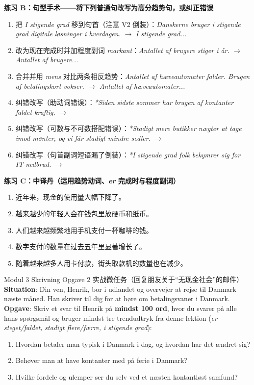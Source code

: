 \textbf{练习 B：句型手术——将下列普通句改写为高分趋势句，或纠正错误}
\begin{enumerate}
  \item 把 \textit{I stigende grad} 移到句首（注意 V2 倒装）：\textit{Danskerne bruger i stigende grad digitale løsninger i hverdagen.} $\rightarrow$ \textit{I stigende grad...}
  \item 改为现在完成时并加程度副词 \textit{markant}：\textit{Antallet af brugere stiger i år.} $\rightarrow$ \textit{Antallet af brugere...}
  \item 合并并用 \textit{mens} 对比两条相反趋势：\textit{Antallet af hæveautomater falder. Brugen af betalingskort vokser.} $\rightarrow$ \textit{Antallet af hæveautomater...}
  \item 纠错改写（助动词错误）：\textit{*Siden sidste sommer har brugen af kontanter faldet kraftig.} $\rightarrow$
  \item 纠错改写（可数与不可数搭配错误）：\textit{*Stadigt mere butikker nægter at tage imod mønter, og vi får stadigt mindre sedler.} $\rightarrow$
  \item 纠错改写（句首副词短语漏了倒装）：\textit{*I stigende grad folk bekymrer sig for IT-nedbrud.} $\rightarrow$
\end{enumerate}

\textbf{练习 C：中译丹（运用趋势动词、\textit{er} 完成时与程度副词）}
\begin{enumerate}
  \item 近年来，现金的使用量大幅下降了。
  \item 越来越少的年轻人会在钱包里放硬币和纸币。
  \item 人们越来越频繁地用手机支付一杯咖啡的钱。
  \item 数字支付的数量在过去五年里显著增长了。
  \item 随着越来越多人用卡付款，街头取款机的数量也在减少。
\end{enumerate}


\begin{emailbox}{Modul 3 Skrivning Opgave 2 实战微任务（回复朋友关于“无现金社会”的邮件）}
\textbf{Situation}: Din ven, Henrik, bor i udlandet og overvejer at rejse til Danmark næste måned. Han skriver til dig for at høre om betalingsvaner i Danmark.\\
\textbf{Opgave}: Skriv et svar til Henrik på \textbf{mindst 100 ord}, hvor du svarer på alle hans spørgsmål og bruger mindst tre trendudtryk fra denne lektion (\textit{er steget/faldet, stadigt flere/færre, i stigende grad}):
\begin{enumerate}
  \item Hvordan betaler man typisk i Danmark i dag, og hvordan har det ændret sig?
  \item Behøver man at have kontanter med på ferie i Danmark?
  \item Hvilke fordele og ulemper ser du selv ved et næsten kontantløst samfund?
\end{enumerate}
\end{emailbox}


